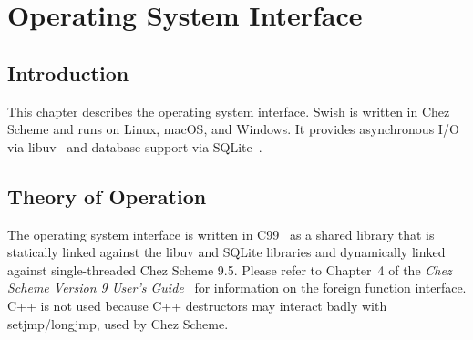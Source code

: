 %
%
%

\chapter {Operating System Interface}\label{chap:osi}

\section {Introduction}

This chapter describes the operating system interface. Swish is
written in Chez Scheme and runs on Linux, macOS, and Windows. It
provides asynchronous I/O via libuv~\cite{libuv} and database support
via SQLite~\cite{sqlite-guide}.

\section {Theory of Operation}

The operating system interface is written in C99~\cite{c99} as a
shared library that is statically linked against the libuv and SQLite
libraries and dynamically linked against single-threaded Chez Scheme
9.5.  Please refer to Chapter~4 of the \emph{Chez Scheme Version 9
  User's Guide}~\cite{chez-scheme-users-guide} for information on the
foreign function interface. C++ is not used because C++ destructors
may interact badly with setjmp/longjmp, used by Chez Scheme.

